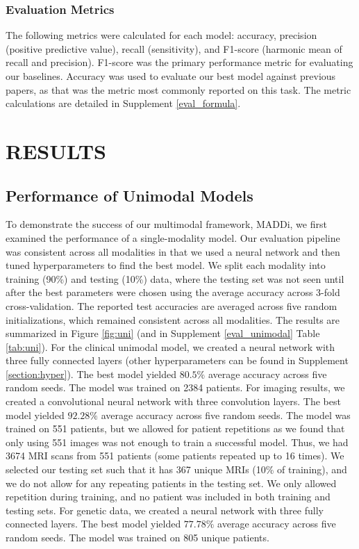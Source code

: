 \documentclass[11pt]{article}
\begin{document}
\subsubsection*{Evaluation Metrics}
The following metrics were calculated for each model: accuracy, precision (positive predictive value), recall (sensitivity), and F1-score (harmonic mean of recall and precision). F1-score was the primary performance metric for evaluating our baselines. Accuracy was used to evaluate our best model against previous papers, as that was the metric most commonly reported on this task. The metric calculations are detailed in Supplement \ref{eval_formula}.


\section*{RESULTS}
\subsection*{Performance of Unimodal Models}
\label{subsection:uni_frame}
To demonstrate the success of our multimodal framework, MADDi, we first examined the performance of a single-modality model. Our evaluation pipeline was consistent across all modalities in that we used a neural network and then tuned hyperparameters to find the best model. We split each modality into training (90\%) and testing (10\%) data, where the testing set was not seen until after the best parameters were chosen using the average accuracy across 3-fold cross-validation. The reported test accuracies are averaged across five random initializations, which remained consistent across all modalities. 
The results are summarized in Figure \ref{fig:uni} (and in Supplement \ref{eval_unimodal} Table \ref{tab:uni}). For the clinical unimodal model, we created a neural network with three fully connected layers (other hyperparameters can be found in Supplement \ref{section:hyper}). The best model yielded $80.5\%$ average accuracy across five random seeds. The model was trained on 2384 patients.
For imaging results, we created a convolutional neural network with three convolution layers. The best model yielded $92.28\%$ average accuracy across five random seeds. The model was trained on 551 patients, but we allowed for patient repetitions as we found that only using 551 images was not enough to train a successful model. Thus, we had 3674 MRI scans from 551 patients (some patients repeated up to 16 times). We selected our testing set such that it has 367 unique MRIs (10\% of training), and we do not allow for any repeating patients in the testing set. We only allowed repetition during training, and no patient was included in both training and testing sets. 
For genetic data, we created a neural network with three fully connected layers. The best model yielded $77.78\%$ average accuracy across five random seeds. The model was trained on 805 unique patients.
\end{document}
